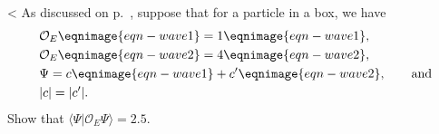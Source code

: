 <%
As discussed on p.~\pageref{two-point-five-kids}, suppose that for a
particle in a box, we have
\begin{align*}
  &\mathcal{O}_E\eqnimage{eqn-wave1} =1\eqnimage{eqn-wave1},\\
  &\mathcal{O}_E\eqnimage{eqn-wave2} =4\eqnimage{eqn-wave2},  \\
  &\Psi =c\eqnimage{eqn-wave1}+c'\eqnimage{eqn-wave2}, \qquad \text{and}\\
  &|c|=|c'|.
\end{align*}
Show that $\langle \Psi | \mathcal{O}_E \Psi\rangle=2.5$.
